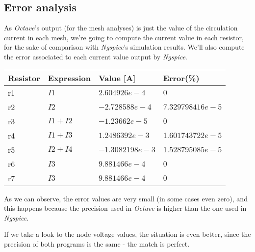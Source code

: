 \subsection{Error analysis}
\label{ssec:Error analysis}
\par As \emph{Octave}'s output (for the mesh analyses) is just the value of the circulation current in each mesh, we're going to compute the current value in each resistor, for the sake of comparison with \emph{Ngspice}'s simulation results. We'll also compute the error associated to each current value output by \emph{Ngspice}.
\vspace{5mm}

\begin{table}[H]
\centering
\begin{tabularx}{0.8\textwidth} {
  | >{\raggedright\arraybackslash}X
  | >{\centering\arraybackslash}X
  | >{\centering\arraybackslash}X
  | >{\raggedleft\arraybackslash}X | }
 \hline
 Resistor & Expression & Value [A] & Error(\%)\\
 \hline
 r1 & $I1$ & $2.604926e-4$ & $0$ \\
 \hline
 r2 & $I2$ & $-2.728588e-4$ & $7.329798416e-5$ \\
 \hline
 r3 & $I1+I2$ & $-1.23662e-5$ & $0$ \\
 \hline
 r4 & $I1+I3$ & $1.2486392e-3$ & $1.601743722e-5$ \\
 \hline
 r5 & $I2+I4$ & $-1.3082198e-3$ & $1.528795085e-5$ \\
 \hline
 r6 & $I3$ & $9.881466e-4$ & $0$ \\
 \hline
 r7 & $I3$ & $9.881466e-4$ & $0$ \\
\hline
\end{tabularx}
\end{table}

\vspace{5mm}
\par As we can observe, the error values are very small (in some cases even zero), and this happens because the precision used in \emph{Octave} is higher than the one used in \emph{Ngspice}.
\par If we take a look to the node voltage values, the situation is even better, since the precision of both programs is the same - the match is perfect.
